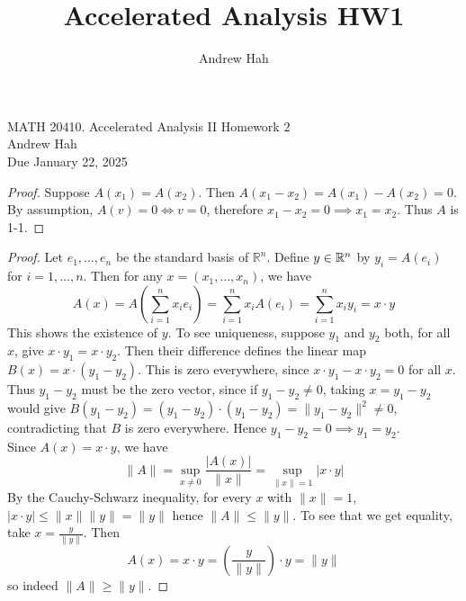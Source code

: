 \documentclass[11pt]{article}
\title{Accelerated Analysis HW1}
\author{Andrew Hah}
\begin{document}
\pagestyle{plain}
\begin{center}
{\Large MATH 20410. Accelerated Analysis II Homework 2} \\ 
\vspace{.2in}  
Andrew Hah \\
Due January 22, 2025
\end{center}

\begin{exercise}{9.3}
    \begin{proof}
        Suppose $A(x_1) = A(x_2)$. Then $A(x_1 - x_2) = A(x_1) - A(x_2) = 0$. By assumption, $A(v) = 0 \iff v = 0$, therefore $x_1 - x_2 = 0 \implies x_1 = x_2$. Thus $A$ is 1-1. 
    \end{proof}
\end{exercise}

\begin{exercise}{9.5}
    \begin{proof}
        Let $e_1, \dots, e_n$ be the standard basis of $\mathbb{R}^n$. Define $y \in \mathbb{R}^n$ by $y_i = A(e_i)$ for $i = 1, \dots, n$. Then for any $x = (x_1, \dots, x_n)$, we have $$A(x) = A \left( \sum_{i = 1}^n x_i e_i \right) = \sum_{i = 1}^n x_i A(e_i) = \sum_{i = 1}^n x_i y_i = x \cdot y$$ This shows the existence of $y$. To see uniqueness, suppose $y_1$ and $y_2$ both, for all $x$, give $x \cdot y_1 = x \cdot y_2$. Then their difference defines the linear map $B(x) = x \cdot (y_1 - y_2)$. This is zero everywhere, since $x \cdot y_1 - x \cdot y_2 = 0$ for all $x$. Thus $y_1 - y_2$ must be the zero vector, since if $y_1 - y_2 \neq 0$, taking $x = y_1 - y_2$ would give $B(y_1 - y_2) = (y_1 - y_2) \cdot (y_1 - y_2) = \| y_1 - y_2 \|^2 \neq 0$, contradicting that $B$ is zero everywhere. Hence $y_1 - y_2 = 0 \implies y_1 = y_2$. \\

        Since $A(x) = x \cdot y$, we have \begin{equation*}
                \| A \|  = \sup_{x \neq 0} \frac{| A(x) |}{\| x \|} = \sup_{\| x \| = 1} |x \cdot y| 
        \end{equation*} By the Cauchy-Schwarz inequality, for every $x$ with $\| x \| = 1$, $| x \cdot y | \le \| x \| \| y \| = \| y \|$ hence $\| A \| \le \| y \|$. To see that we get equality, take $x = \frac{y}{\| y \|}$. Then $$A(x) = x \cdot y = \left( \frac{y}{\| y \|} \right) \cdot y = \| y \|$$ so indeed $\| A \| \ge \| y \|$.         
    \end{proof}
\end{exercise}
\end{document}
